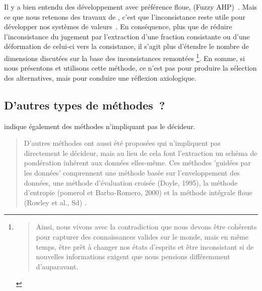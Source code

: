 Il y a bien entendu des développement avec préférence floue, (Fuzzy AHP)~\cite{hanine_new_2016}.
Mais ce que nous retenons des travaux de \citeauthor{saaty_decision_2004}, c'est que l’inconsistance reste utile pour développer nos systèmes de valeurs~\cite[5. From Consistency to Inconsistency]{saaty_decision_2004}.
En conséquence, plus que de réduire l'inconsistance du jugement par l'extraction d'une fraction consistante ou d'une déformation de celui-ci vers la consistance, il s'agit plus d'étendre le nombre de dimensions discutées sur la base des inconsistances remontées
\footnote{
\blockcquote[traduction]{saaty_decision_2004}{
Ainsi, nous vivons avec la contradiction que nous devons être cohérents pour capturer des connaissances valides sur le monde, mais en même temps, être prêt à changer nos états d'esprits et être inconsistant si de nouvelles informations exigent que nous pensions différemment d'auparavant.
}
}.
En somme, si nous présentons et utilisons cette méthode, ce n'est pas pour produire la sélection des alternatives, mais pour conduire une réflexion axiologique.
%		

\subsection{D'autres types de méthodes~?}

\citeauthor{rowley_aggregating_2012} indique également des méthodes n'impliquant pas le décideur.
\blockcquote[traduction]{rowley_aggregating_2012}{
D'autres méthodes ont aussi été proposées qui n'impliquent pas directement le décideur, mais au lieu de cela font l'extraction un schéma de pondération inhérent aux données elles-même.
Ces méthodes 'guidées par les données' comprennent une méthode basée sur l'enveloppement des données, une méthode d'évaluation croisée (Doyle, 1995), la méthode d'entropie (pomerol et Barba-Romero, 2000) et la méthode intégrale floue (Rowley et al., Sd) .}

